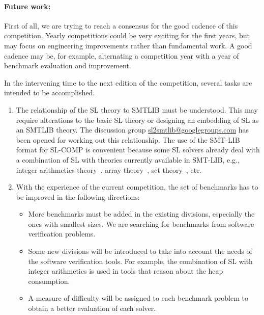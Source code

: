 \documentclass[twoside,11pt]{article}
\begin{document}
\paragraph{Future work:}
First of all, we are trying to reach a consensus for the good cadence of this competition. Yearly competitions could be very exciting for the first years, but may focus on engineering improvements rather than fundamental work. 
A good cadence may be, for example, alternating a competition year with a year of benchmark evaluation and improvement.

In the intervening time to the next edition of the competition, several tasks are intended to be accomplished.
\begin{enumerate}

\item The relationship of the SL theory to SMTLIB must be understood. This may require alterations to
the basic SL theory or designing an embedding of SL as an SMTLIB theory.
The discussion group \url{sl2smtlib@googlegroups.com} has been opened for working out this relationship. 
The use of the SMT-LIB format for SL-COMP is convenient because some SL solvers already deal with a combination of SL with theories currently available in SMT-LIB, e.g., 
integer arithmetics theory~\cite{PerezR11}, array theory~\cite{BouajjaniDES12-vmcai}, set theory~\cite{PiskacWZ13}, etc.


\item With the experience of the current competition, the set of benchmarks has to be improved in the following directions:
\begin{itemize}
\item More benchmarks must be added in the existing divisions, especially the ones with smallest sizes. 
We are searching for benchmarks from software verification problems.

\item Some new divisions will be introduced to take into account the needs of the software verification tools. For example, the combination of SL with integer arithmetics is used in tools that reason about the heap consumption.

\item A measure of difficulty will be assigned to each benchmark problem to obtain a better evaluation of each solver.
\end{itemize}


\end{enumerate}
\end{document}
